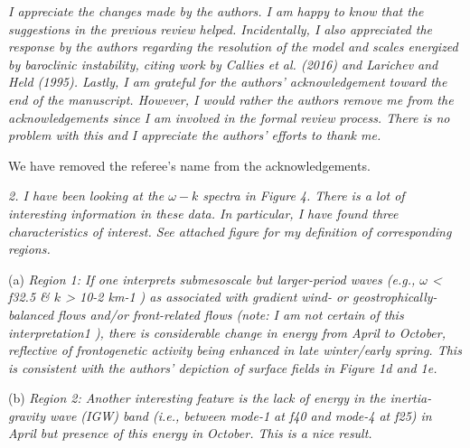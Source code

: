 \documentclass[11pt]{article}
\newcommand{\bdp}{\begin{description}}
\newcommand{\edp}{\end{description}}
\begin{document}
\begin{enumerate}
 \item {\it I appreciate the changes made by the authors. I am happy to know that the suggestions in
the previous review helped. Incidentally, I also appreciated the response by the authors
regarding the resolution of the model and scales energized by baroclinic instability, citing
work by Callies et al. (2016) and Larichev and Held (1995). Lastly, I am grateful for the
authors’ acknowledgement toward the end of the manuscript. However, I would rather the
authors remove me from the acknowledgements since I am involved in the formal review
process. There is no problem with this and I appreciate the authors’ efforts to thank me.}

\bdp
   \item We have removed the referee's name from the acknowledgements.
\edp

\item {\it 2. I have been looking at the $\omega-k$ spectra in Figure 4. There is a lot of interesting
information in these data. In particular, I have found three characteristics of interest. See
attached figure for my definition of corresponding regions.}

    \subitem (a) {\it Region 1: If one interprets submesoscale but larger-period waves (e.g., $\omega$ < f32.5 \& $k$ >
10-2 km-1
) as associated with gradient wind- or geostrophically-balanced flows and/or
front-related flows (note: I am not certain of this interpretation1
), there is considerable
change in energy from April to October, reflective of frontogenetic activity being
enhanced in late winter/early spring. This is consistent with the authors’ depiction of
surface fields in Figure 1d and 1e.}

  \subitem (b) {\it Region 2: Another interesting feature is the lack of energy in the inertia-gravity wave
(IGW) band (i.e., between mode-1 at f40 and mode-4 at f25) in April but presence of
this energy in October. This is a nice result.}


\end{enumerate}
\end{document}
